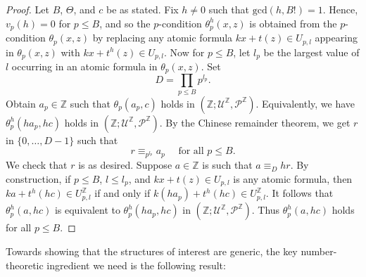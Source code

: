 \documentclass[letterpaper]{amsart}
\newcommand{\zz}{\mathbb{Z}}
\newcommand{\sU}{\mathscr{U}}
\newcommand{\sP}{\mathscr{P}}
\begin{document}
\begin{proof}
Let $B$, $\Theta$, and $c$ be as stated. Fix $h\neq 0$ such that $\mathrm{gcd}(h,B!)=1$. Hence, $v_p(h)=0$ for $p\leq B$, and so  the $p$-condition $\theta_p^h(x,z)$ is obtained from the $p$-condition $\theta_p(x,z)$ by replacing any atomic formula  $kx +t(z) \in U_{p, l}$ appearing in $\theta_p(x,z)$  with $kx +t^h(z) \in U_{p, l}$.
 Now for $p\leq B$, let $l_p$ be the largest value of $l$ occurring in an atomic formula in  $\theta_p(x,z)$. 
Set 
$$D = \prod_{p \leq B} p^{l_p}. $$
Obtain $a_p \in \zz$ such that $\theta_p(a_p, c)$ holds in $(\zz; \sU^\zz, \sP^\zz)$. Equivalently, we have $\theta^h_p(ha_p, hc)$ holds in $(\zz; \sU^\zz, \sP^\zz)$.  By the Chinese remainder theorem, we get $r$ in $\{0, \ldots, D-1\}$ such that 
$$r\equiv_{p^{l_p}} a_p\quad \text{ for all } p \leq B.$$ 
We check that $r$ is as desired. Suppose $a \in \zz$ is such that $a \equiv_D hr$. By construction, if $p\leq B$, $l \leq l_p$, and 
$kx+t(z) \in U_{p,l }$ is any atomic formula, then  $ka +t^h(hc) \in U^\zz_{p, l}$ if and only if $k(ha_p) +t^h(hc) \in U^\zz_{p, l}$. It follows that $\theta^h_p( a, hc)$ is equivalent to $\theta^h_p( ha_p, hc)$ in $(\zz; \sU^\zz, \sP^\zz)$. Thus $\theta^h_p( a, hc)$ holds for all $p \leq B$.  
\end{proof}

\noindent Towards showing that the structures of interest are generic, the key number-theoretic ingredient we need is the following result:
\end{document}
